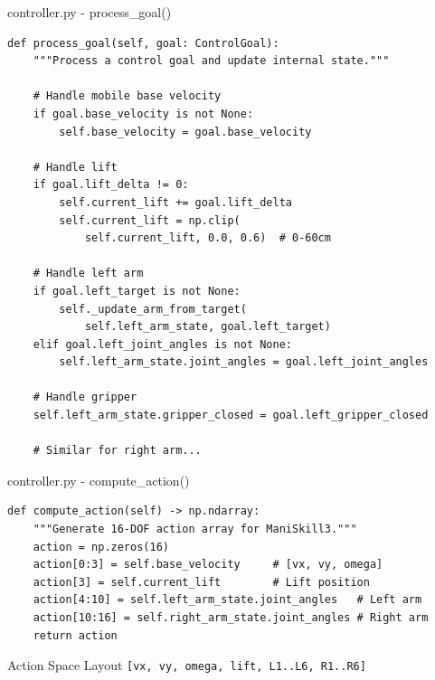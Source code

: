 \begin{frame}[fragile,shrink=3]{controller.py - process\_goal()}
\begin{lstlisting}
def process_goal(self, goal: ControlGoal):
    """Process a control goal and update internal state."""

    # Handle mobile base velocity
    if goal.base_velocity is not None:
        self.base_velocity = goal.base_velocity

    # Handle lift
    if goal.lift_delta != 0:
        self.current_lift += goal.lift_delta
        self.current_lift = np.clip(
            self.current_lift, 0.0, 0.6)  # 0-60cm

    # Handle left arm
    if goal.left_target is not None:
        self._update_arm_from_target(
            self.left_arm_state, goal.left_target)
    elif goal.left_joint_angles is not None:
        self.left_arm_state.joint_angles = goal.left_joint_angles

    # Handle gripper
    self.left_arm_state.gripper_closed = goal.left_gripper_closed

    # Similar for right arm...
\end{lstlisting}
\end{frame}

\begin{frame}[fragile]{controller.py - compute\_action()}
\begin{lstlisting}[basicstyle=\ttfamily\scriptsize]
def compute_action(self) -> np.ndarray:
    """Generate 16-DOF action array for ManiSkill3."""
    action = np.zeros(16)
    action[0:3] = self.base_velocity     # [vx, vy, omega]
    action[3] = self.current_lift        # Lift position
    action[4:10] = self.left_arm_state.joint_angles   # Left arm
    action[10:16] = self.right_arm_state.joint_angles # Right arm
    return action
\end{lstlisting}

\begin{block}{Action Space Layout}
\small\texttt{[vx, vy, omega, lift, L1..L6, R1..R6]}
\end{block}
\end{frame}

